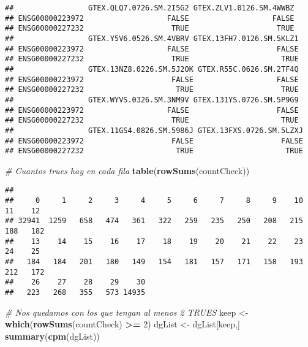 \documentclass[
]{article}
\newenvironment{Shaded}{\begin{snugshade}}{\end{snugshade}}
\newcommand{\CommentTok}[1]{\textcolor[rgb]{0.56,0.35,0.01}{\textit{#1}}}
\newcommand{\DecValTok}[1]{\textcolor[rgb]{0.00,0.00,0.81}{#1}}
\newcommand{\KeywordTok}[1]{\textcolor[rgb]{0.13,0.29,0.53}{\textbf{#1}}}
\newcommand{\NormalTok}[1]{#1}
\newcommand{\OperatorTok}[1]{\textcolor[rgb]{0.81,0.36,0.00}{\textbf{#1}}}
\newcommand{\StringTok}[1]{\textcolor[rgb]{0.31,0.60,0.02}{#1}}
\begin{document}
\begin{verbatim}
##                 GTEX.QLQ7.0726.SM.2I5G2 GTEX.ZLV1.0126.SM.4WWBZ
## ENSG00000223972                   FALSE                   FALSE
## ENSG00000227232                    TRUE                    TRUE
##                 GTEX.Y5V6.0526.SM.4VBRV GTEX.13FH7.0126.SM.5KLZ1
## ENSG00000223972                   FALSE                    FALSE
## ENSG00000227232                    TRUE                     TRUE
##                 GTEX.13NZ8.0226.SM.5J2OK GTEX.R55C.0626.SM.2TF4Q
## ENSG00000223972                    FALSE                   FALSE
## ENSG00000227232                     TRUE                    TRUE
##                 GTEX.WYVS.0326.SM.3NM9V GTEX.131YS.0726.SM.5P9G9
## ENSG00000223972                   FALSE                    FALSE
## ENSG00000227232                    TRUE                     TRUE
##                 GTEX.11GS4.0826.SM.5986J GTEX.13FXS.0726.SM.5LZXJ
## ENSG00000223972                    FALSE                    FALSE
## ENSG00000227232                     TRUE                     TRUE
\end{verbatim}

\begin{Shaded}
\begin{Highlighting}[]
\CommentTok{# Cuantos trues hay en cada fila}
\KeywordTok{table}\NormalTok{(}\KeywordTok{rowSums}\NormalTok{(countCheck))}
\end{Highlighting}
\end{Shaded}

\begin{verbatim}
## 
##     0     1     2     3     4     5     6     7     8     9    10    11    12 
## 32941  1259   658   474   361   322   259   235   250   208   215   188   182 
##    13    14    15    16    17    18    19    20    21    22    23    24    25 
##   184   184   201   180   149   154   181   157   171   158   193   212   172 
##    26    27    28    29    30 
##   223   268   355   573 14935
\end{verbatim}

\begin{Shaded}
\begin{Highlighting}[]
\CommentTok{# Nos quedamos con los que tengan al menos 2 TRUES}
\NormalTok{keep <-}\StringTok{ }\KeywordTok{which}\NormalTok{(}\KeywordTok{rowSums}\NormalTok{(countCheck) }\OperatorTok{>=}\StringTok{ }\DecValTok{2}\NormalTok{)}
\NormalTok{dgList <-}\StringTok{ }\NormalTok{dgList[keep,]}
\KeywordTok{summary}\NormalTok{(}\KeywordTok{cpm}\NormalTok{(dgList))}
\end{Highlighting}
\end{Shaded}
\end{document}
